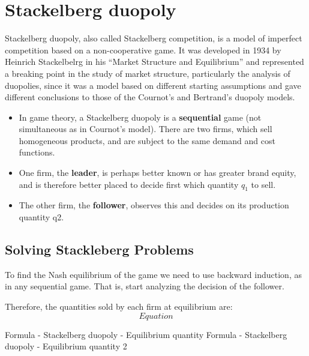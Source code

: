 \documentclass[]{report}
\begin{document}
\section{Stackelberg duopoly}
Stackelberg duopoly, also called Stackelberg competition, is a model of imperfect competition based on a non-cooperative game. It was developed in 1934 by Heinrich Stackelbelrg in his “Market Structure and Equilibrium” and represented a breaking point in the study of market structure, particularly the analysis of duopolies, since it was a model based on different starting assumptions and gave different conclusions to those of the Cournot’s and Bertrand’s duopoly models.

\begin{itemize}
\item In game theory, a Stackelberg duopoly is a \textbf{sequential} game (not simultaneous as in Cournot’s model). There are two firms, which sell homogeneous products, and are subject to the same demand and cost functions. 
\item One firm, the \textbf{leader}, is perhaps better known or has greater brand equity, and is therefore better placed to decide first which quantity $q_1$ to sell.
\item The other firm, the \textbf{follower}, observes this and decides on its production quantity q2. 
\end{itemize}

\subsection*{Solving Stackleberg Problems}
\item To find the Nash equilibrium of the game we need to use backward induction, as in any sequential game. That is, start analyzing the decision of the follower.

\item 

Therefore, the quantities sold by each firm at equilibrium are:
\[ Equation \]

Formula - Stackelberg duopoly - Equilibrium quantity	Formula - Stackelberg duopoly - Equilibrium quantity 2
\end{document}
